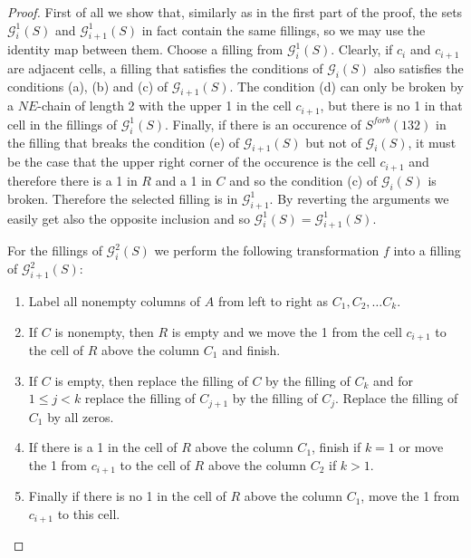 \begin{proof}
First of all we show that, similarly as in the first part of the proof, the sets $\mathcal{G}_i^1(S)$ and $\mathcal{G}_{i+1}^1(S)$
in fact contain the same fillings, so we may use the identity map between them. Choose a filling from $\mathcal{G}_i^1(S)$.
Clearly, if $c_i$ and $c_{i+1}$ are adjacent cells, a filling that satisfies the conditions of $\mathcal{G}_i(S)$ 
also satisfies the conditions (a), (b) and (c) of $\mathcal{G}_{i+1}(S)$. The condition (d) can only be broken by a $NE$-chain of 
length 2 with the upper 1 in the cell $c_{i+1}$, but there is no 1 in that cell in the fillings of $\mathcal{G}_i^1(S)$.
Finally, if there is an occurence of $S^{forb}(132)$ in the filling that breaks the condition (e) of $\mathcal{G}_{i+1}(S)$
but not of $\mathcal{G}_i(S)$, it must be the case that the upper right corner of the occurence is the cell $c_{i+1}$ and therefore 
there is a 1 in $R$ and a 1 in $C$ and so the condition (c) of $\mathcal{G}_i(S)$ is broken. Therefore the selected filling
is in $\mathcal{G}_{i+1}^1$. By reverting the arguments we easily get also the opposite inclusion and so $\mathcal{G}_i^1(S) =
\mathcal{G}_{i+1}^1(S)$.

For the fillings of $\mathcal{G}^2_i(S)$ 
we perform the following transformation $f$ into a filling of $\mathcal{G}^2_{i+1}(S)$:
\begin{enumerate}
\item Label all nonempty columns of $A$ from left to right as $C_1, C_2, \ldots C_k$.
\item If $C$ is nonempty, then $R$ is empty and we move the 1 from the cell $c_{i+1}$ to the cell of $R$ above
the column $C_1$ and finish.
\item If $C$ is empty, then replace the filling of $C$ by the filling of $C_k$ and for $1 \leq j < k$ replace
the filling of $C_{j+1}$ by the filling of $C_j$. Replace the filling of $C_1$ by all zeros.
\item If there is a 1 in the cell of $R$ above the column $C_1$, finish if $k = 1$ or move the 1 from $c_{i+1}$ to the cell of $R$
above the column $C_2$ if $k > 1$.
\item Finally if there is no 1 in the cell of $R$ above the column $C_1$, move the 1 from $c_{i+1}$ to this cell.
\end{enumerate}


\end{proof}

